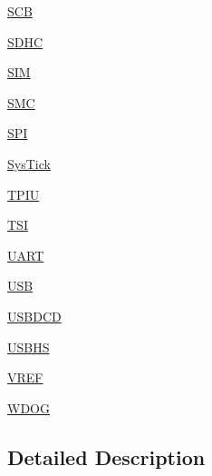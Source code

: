 \begin{DoxyCompactItemize}
\item 
\hyperlink{group___s_c_b___peripheral}{S\+C\+B}
\item 
\hyperlink{group___s_d_h_c___peripheral}{S\+D\+H\+C}
\item 
\hyperlink{group___s_i_m___peripheral}{S\+I\+M}
\item 
\hyperlink{group___s_m_c___peripheral}{S\+M\+C}
\item 
\hyperlink{group___s_p_i___peripheral}{S\+P\+I}
\item 
\hyperlink{group___sys_tick___peripheral}{Sys\+Tick}
\item 
\hyperlink{group___t_p_i_u___peripheral}{T\+P\+I\+U}
\item 
\hyperlink{group___t_s_i___peripheral}{T\+S\+I}
\item 
\hyperlink{group___u_a_r_t___peripheral}{U\+A\+R\+T}
\item 
\hyperlink{group___u_s_b___peripheral}{U\+S\+B}
\item 
\hyperlink{group___u_s_b_d_c_d___peripheral}{U\+S\+B\+D\+C\+D}
\item 
\hyperlink{group___u_s_b_h_s___peripheral}{U\+S\+B\+H\+S}
\item 
\hyperlink{group___v_r_e_f___peripheral}{V\+R\+E\+F}
\item 
\hyperlink{group___w_d_o_g___peripheral}{W\+D\+O\+G}
\end{DoxyCompactItemize}


\subsection{Detailed Description}

